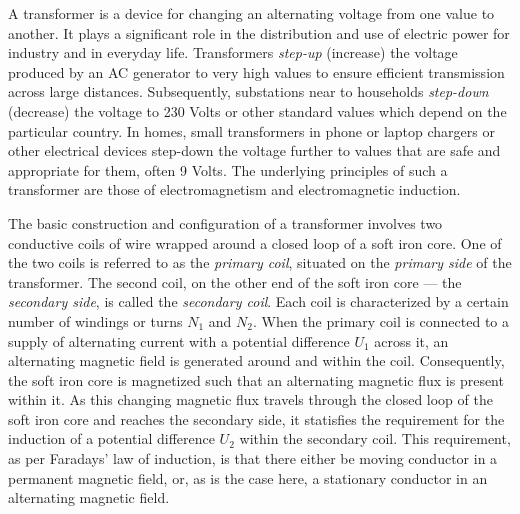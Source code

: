 



\thispagestyle{plain}



A transformer is a device for changing an alternating voltage from one value to another. It plays a significant role in the distribution and use of electric power for industry and in everyday life. Transformers \emph{step-up} (increase) the voltage produced by an AC generator to very high values to ensure efficient transmission across large distances.  Subsequently, substations near to households \emph{step-down} (decrease) the voltage to 230 Volts or other standard values which depend on the particular country. In homes, small transformers in phone or laptop chargers or other electrical devices step-down the voltage further to values that are safe and appropriate for them, often 9 Volts. The underlying principles of such a transformer are those of electromagnetism and electromagnetic induction. 


The basic construction and configuration of a transformer involves two conductive coils of wire wrapped around a closed loop of a soft iron core. One of the two coils is referred to as the \emph{primary coil}, situated on the \emph{primary side} of the transformer. The second coil, on the other end of the soft iron core --- the \emph{secondary side}, is called the \emph{secondary coil}. Each coil is characterized by a certain number of windings or turns $N_1$ and $N_2$. When the primary coil is connected to a supply of alternating current with a potential difference $U_1$ across it, an alternating magnetic field is generated around and within the coil. Consequently, the soft iron core is magnetized such that an alternating magnetic flux is present within it. As this changing magnetic flux travels through the closed loop of the soft iron core and reaches the secondary side, it statisfies the requirement for the induction of a potential difference $U_2$ within the secondary coil. This requirement, as per Faradays' law of induction, is that there either be moving conductor in a permanent magnetic field, or, as is the case here, a stationary conductor in an alternating magnetic field. 

